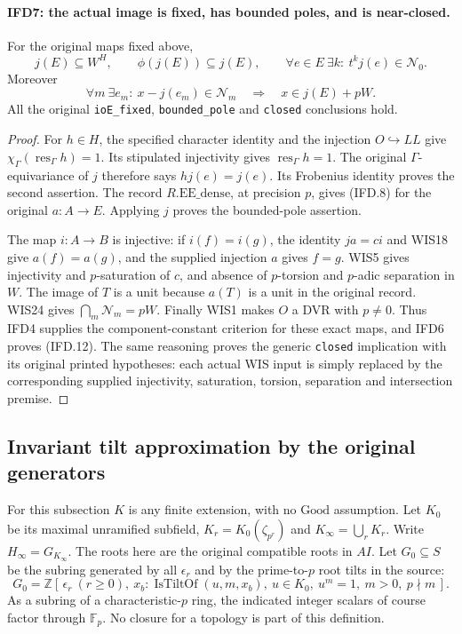 \paragraph{IFD7: the actual image is fixed, has bounded poles, and is near-closed.}
\label{claim:IFD7}
For the original maps fixed above,
\[
 j(E)\subseteq W^H,\qquad \phi(j(E))\subseteq j(E),\qquad
 \forall e\in E\ \exists k:\ t^kj(e)\in\mathcal N_0.       \tag{IFD.11}
\]
Moreover
\[
 \forall m\ \exists e_m:\ x-j(e_m)\in\mathcal N_m
               \quad\Longrightarrow\quad x\in j(E)+pW.    \tag{IFD.12}
\]
All the original \texttt{ioE\_fixed}, \texttt{bounded\_pole} and
\texttt{closed} conclusions hold.

\begin{proof}
For $h\in H$, the specified character identity and the injection
$O\hookrightarrow LL$ give $\chi_\Gamma(\operatorname{res}_\Gamma h)=1$.
Its stipulated injectivity gives $\operatorname{res}_\Gamma h=1$.
The original $\Gamma$-equivariance of $j$ therefore says $hj(e)=j(e)$.
Its Frobenius identity proves the second assertion.
The record $R.\mathrm{EE\_dense}$, at precision $p$, gives (IFD.8)
for the original $a:A\to E$. Applying $j$ proves the bounded-pole
assertion.

The map $i:A\to B$ is injective: if $i(f)=i(g)$, the identity
$ja=ci$ and WIS18 give $a(f)=a(g)$, and the supplied injection $a$
gives $f=g$. WIS5 gives injectivity and $p$-saturation of $c$,
and absence of $p$-torsion and $p$-adic separation in $W$.
The image of $T$ is a unit because $a(T)$ is a unit in the original
record. WIS24 gives $\bigcap_m\mathcal N_m=pW$.
Finally WIS1 makes $O$ a DVR with $p\ne0$.
Thus IFD4 supplies the component-constant criterion for these exact
maps, and IFD6 proves (IFD.12). The same reasoning proves the generic
\texttt{closed} implication with its original printed hypotheses:
each actual WIS input is simply replaced by the corresponding supplied
injectivity, saturation, torsion, separation and intersection premise.
\end{proof}

\subsection{Invariant tilt approximation by the original generators}

For this subsection $K$ is any finite extension, with no
$\mathrm{Good}$ assumption. Let $K_0$ be its maximal unramified
subfield, $K_r=K_0(\zeta_{p^r})$ and
$K_\infty=\bigcup_rK_r$. Write $H_\infty=G_{K_\infty}$.
The roots here are the original compatible roots in $AI$.
Let $G_0\subseteq S$ be the subring generated by all $\epsilon_r$
and by the prime-to-$p$ root tilts in the source:
\[
 G_0=\mathbb Z[\,\epsilon_r\ (r\geq0),\ x_b:
  \operatorname{IsTiltOf}(u,m,x_b),\ u\in K_0,\ u^m=1,
                  \ m>0,\ p\nmid m\,].                    \tag{IFD.13}
\]
As a subring of a characteristic-$p$ ring, the indicated integer
scalars of course factor through $\mathbb F_p$.
No closure for a topology is part of this definition.

